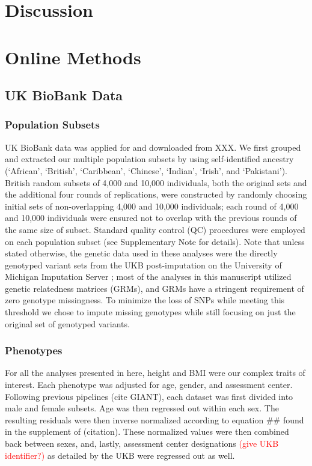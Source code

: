\documentclass[12pt, a4paper]{article}
\begin{document}
\section{Discussion}\label{InterPath-Discussion}


\section{Online Methods}\label{InterPath-Online-Methods}

\subsection{UK BioBank Data}

\subsubsection{Population Subsets}
UK BioBank data was applied for and downloaded from XXX. We first grouped and extracted our multiple population subsets by using self-identified ancestry (`African', `British', `Caribbean', `Chinese', `Indian', `Irish', and `Pakistani'). British random subsets of 4,000 and 10,000 individuals, both the original sets and the additional four rounds of replications, were constructed by randomly choosing initial sets of non-overlapping 4,000 and 10,000 individuals; each round of 4,000 and 10,000 individuals were ensured not to overlap with the previous rounds of the same size of subset. Standard quality control (QC) procedures were employed on each population subset (see Supplementary Note for details). Note that unless stated otherwise, the genetic data used in these analyses were the directly genotyped variant sets from the UKB post-imputation on the University of Michigan Imputation Server \citep{Das2016}; most of the analyses in this manuscript utilized genetic relatedness matrices (GRMs), and GRMs have a stringent requirement of zero genotype missingness. To minimize the loss of SNPs while meeting this threshold we chose to impute missing genotypes while still focusing on just the original set of genotyped variants.

\subsubsection{Phenotypes}

For all the analyses presented in here, height and BMI were our complex traits of interest. Each phenotype was adjusted for age, gender, and assessment center. Following previous pipelines (cite GIANT), each dataset was first divided into male and female subsets. Age was then regressed out within each sex. The resulting residuals were then inverse normalized according to equation \#\# found in the supplement of (citation). These normalized values were then combined back between sexes, and, lastly, assessment center designations \textcolor{red}{(give UKB identifier?)} as detailed by the UKB were regressed out as well. 
\end{document}
